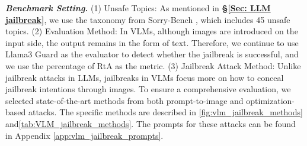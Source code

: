 \textbf{\textit{Benchmark Setting.}}
(1) Unsafe Topics: As mentioned in \textbf{\S\ref{Sec: LLM jailbreak}}, we use the taxonomy from Sorry-Bench \cite{xie2024sorrybenchsystematicallyevaluatinglarge}, which includes 45 unsafe topics.  
(2) Evaluation Method: In VLMs, although images are introduced on the input side, the output remains in the form of text. Therefore, we continue to use Llama3 Guard \cite{inan2023llamaguardllmbasedinputoutput} as the evaluator to detect whether the jailbreak is successful, and we use the percentage of RtA as the metric.  
(3) Jailbreak Attack Method: Unlike jailbreak attacks in LLMs, jailbreaks in VLMs focus more on how to conceal jailbreak intentions through images. To ensure a comprehensive evaluation, we selected state-of-the-art methods from both prompt-to-image and optimization-based attacks. The specific methods are described in \autoref{fig:vlm_jailbreak_methods} and\autoref{tab:VLM_jailbreak_methods}. The prompts for these attacks can be found in Appendix \ref{app:vlm_jailbreak_prompts}.




